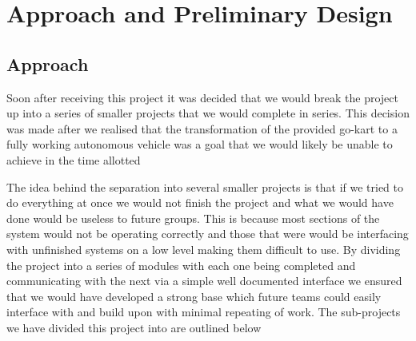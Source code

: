 \chapter{Approach and Preliminary Design}

\section{Approach}
Soon after receiving this project it was decided that we would break the project up into a series of smaller projects that we would complete in series. This decision was made after we realised that the transformation of the provided go-kart to a fully working autonomous vehicle was a goal that we would likely be unable to achieve in the time allotted

The idea behind the separation into several smaller projects is that if we tried to do everything at once we would not finish the project and what we would have done would be useless to future groups. This is because most sections of the system would not be operating correctly and those that were would be interfacing with unfinished systems on a low level making them difficult to use. By dividing the project into a series of modules with each one being completed and communicating with the next via a simple well documented interface we ensured that we would have developed a strong base which future teams could easily interface with and build upon with minimal repeating of work. The sub-projects we have divided this project into are outlined below
